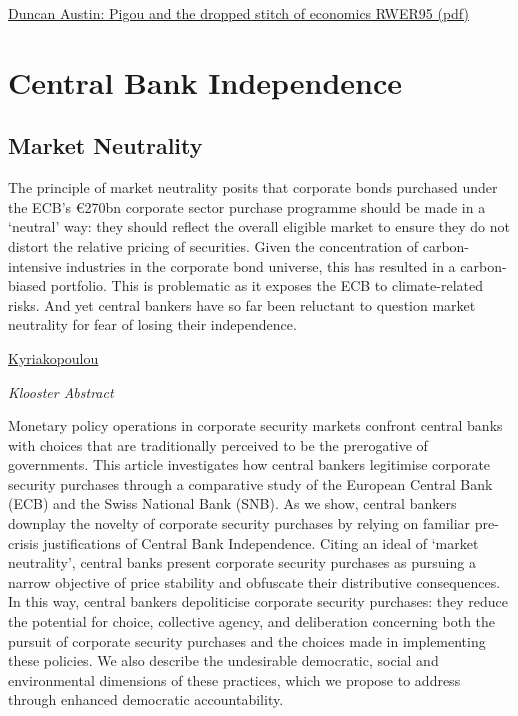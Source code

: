 \documentclass[
]{book}
\begin{document}
\href{pdf/Austin_2021_Pigou_\%20and_the_dropped_stitch_of_economics_RWER95.pdf}{Duncan Austin: Pigou and the dropped stitch of economics RWER95 (pdf)}

\hypertarget{central-bank-independence-1}{%
\section{Central Bank Independence}\label{central-bank-independence-1}}

\hypertarget{market-neutrality}{%
\subsection{Market Neutrality}\label{market-neutrality}}

The principle of market neutrality posits that corporate bonds purchased under the ECB's €270bn corporate sector purchase programme should be made in a `neutral' way: they should reflect the overall eligible market to ensure they do not distort the relative pricing of securities. Given the concentration of carbon-intensive industries in the corporate bond universe, this has resulted in a carbon-biased portfolio. This is problematic as it exposes the ECB to climate-related risks. And yet central bankers have so far been reluctant to question market neutrality for fear of losing their independence.

\href{https://www.omfif.org/2021/02/ecb-market-neutrality-crumbling/}{Kyriakopoulou}

\emph{Klooster Abstract}

Monetary policy operations in corporate security markets confront central
banks with choices that are traditionally perceived to be the prerogative of
governments. This article investigates how central bankers legitimise
corporate security purchases through a comparative study of the
European Central Bank (ECB) and the Swiss National Bank (SNB). As we
show, central bankers downplay the novelty of corporate security
purchases by relying on familiar pre-crisis justifications of Central Bank
Independence. Citing an ideal of `market neutrality', central banks
present corporate security purchases as pursuing a narrow objective of
price stability and obfuscate their distributive consequences. In this way,
central bankers depoliticise corporate security purchases: they reduce
the potential for choice, collective agency, and deliberation concerning
both the pursuit of corporate security purchases and the choices made
in implementing these policies. We also describe the undesirable
democratic, social and environmental dimensions of these practices,
which we propose to address through enhanced democratic
accountability.
\end{document}
